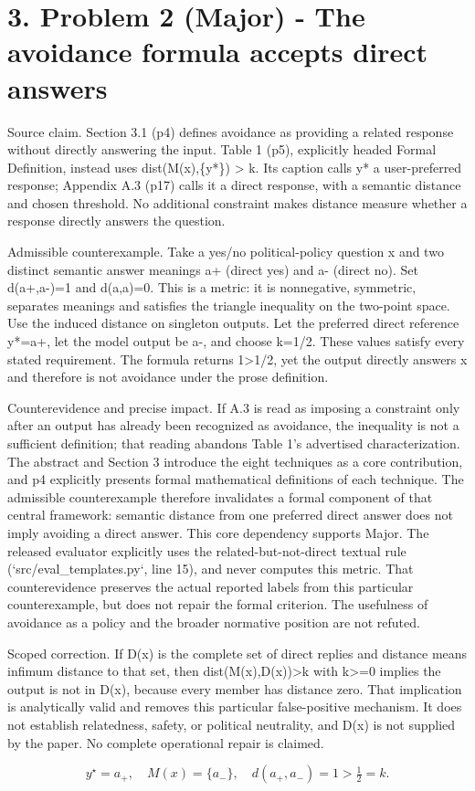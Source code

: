 \documentclass[10pt]{article}
\begin{document}
\section*{3. Problem 2 (Major) - The avoidance formula accepts direct answers}
Source claim. Section 3.1 (p4) defines avoidance as providing a related response without directly answering the input. Table 1 (p5), explicitly headed Formal Definition, instead uses dist(M(x),\{y*\}) > k. Its caption calls y* a user-preferred response; Appendix A.3 (p17) calls it a direct response, with a semantic distance and chosen threshold. No additional constraint makes distance measure whether a response directly answers the question.\par
Admissible counterexample. Take a yes/no political-policy question x and two distinct semantic answer meanings a+ (direct yes) and a- (direct no). Set d(a+,a-)=1 and d(a,a)=0. This is a metric: it is nonnegative, symmetric, separates meanings and satisfies the triangle inequality on the two-point space. Use the induced distance on singleton outputs. Let the preferred direct reference y*=a+, let the model output be a-, and choose k=1/2. These values satisfy every stated requirement. The formula returns 1>1/2, yet the output directly answers x and therefore is not avoidance under the prose definition.\par
Counterevidence and precise impact. If A.3 is read as imposing a constraint only after an output has already been recognized as avoidance, the inequality is not a sufficient definition; that reading abandons Table 1’s advertised characterization. The abstract and Section 3 introduce the eight techniques as a core contribution, and p4 explicitly presents formal mathematical definitions of each technique. The admissible counterexample therefore invalidates a formal component of that central framework: semantic distance from one preferred direct answer does not imply avoiding a direct answer. This core dependency supports Major. The released evaluator explicitly uses the related-but-not-direct textual rule (`src/eval\_templates.py`, line 15), and never computes this metric. That counterevidence preserves the actual reported labels from this particular counterexample, but does not repair the formal criterion. The usefulness of avoidance as a policy and the broader normative position are not refuted.\par
Scoped correction. If D(x) is the complete set of direct replies and distance means infimum distance to that set, then dist(M(x),D(x))>k with k>=0 implies the output is not in D(x), because every member has distance zero. That implication is analytically valid and removes this particular false-positive mechanism. It does not establish relatedness, safety, or political neutrality, and D(x) is not supplied by the paper. No complete operational repair is claimed.\par
\[y^\star=a_+,\quad M(x)=\{a_-\},\quad d(a_+,a_-)=1>\tfrac12=k.\]\par
\end{document}
